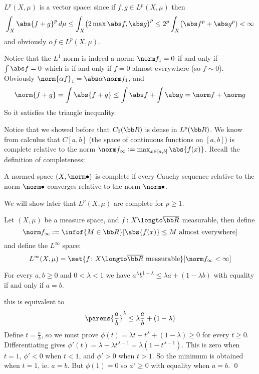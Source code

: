 \edefn

$L^p(X,\mu)$ is a vector space: since if $f,g\in L^p(X,\mu)$ then
$$ \int_X\abs{f+g}^p\,d\mu \leq \int_X\bigl(2\max{\abs f,\abs g}\bigr)^p \leq 2^p\int_X\bigl(\abs f^p+\abs g^p) < \infty $$
and obviously $\alpha f\in L^p(X,\mu)$.

Notice that the $L^1$-norm is indeed a norm: $\norm f_1=0$ if and only if $\int \abs f=0$ which is if and only if $f=0$ almost everywhere (so $f\sim0$).
Obviously $\norm{\alpha f}_1=\abs\alpha\norm f_1$, and
$$ \norm{f+g} = \int\abs{f+g} \leq \int\abs f + \int\abs g = \norm f + \norm g $$
So it satisfies the triangle inequality.

Notice that we showed before that $C_0({\bb R})$ is dense in $L^p({\bb R})$.
We know from calculus that $C[a,b]$ (the space of continuous functions on $[a,b]$) is complete relative to the norm $\norm f_\infty\coloneqq\max_{x\in[a,b]}\abs{f(x)}$.
Recall the definition of completeness:

\bdefn

    A normed space $(X,\norm\bullet)$ is {\emphcolor complete} if every Cauchy sequence relative to the norm $\norm\bullet$ converges relative to the norm $\norm\bullet$.

\edefn

We will show later that $L^p(X,\mu)$ are complete for $p\geq1$.

\bdefn

    Let $(X,\mu)$ be a measure space, and $f\colon X\longto\overline{\bb R}$ measurable, then define
    $$ \norm f_\infty \coloneqq \infof{M\in{\bb R}}[\abs{f(x)}\leq M\hbox{ almost everywhere}] $$
    and define the $L^\infty$ space:
    $$ L^\infty(X,\mu) = \set{f\colon X\longto\overline{\bb R}\hbox{ measurable}}[\norm f_\infty<\infty] $$

\edefn

\blemm

    For every $a,b\geq0$ and $0<\lambda<1$ we have $a^\lambda b^{1-\lambda}\leq\lambda a+(1-\lambda b)$ with equality if and only if $a=b$.

\elemm

\Proof this is equivalent to
$$ \parens{\frac ab}^\lambda \leq \lambda\frac ab + (1-\lambda) $$
Define $t=\frac ab$, so we must prove $\phi(t)=\lambda t-t^\lambda+(1-\lambda)\geq0$ for every $t\geq0$.
Differentiating gives $\phi'(t)=\lambda-\lambda t^{\lambda-1}=\lambda(1-t^{\lambda-1})$.
This is zero when $t=1$, $\phi'<0$ when $t<1$, and $\phi'>0$ when $t>1$.
So the minimum is obtained when $t=1$, ie. $a=b$.
But $\phi(1)=0$ so $\phi'\geq0$ with equality when $a=b$.
\qed

